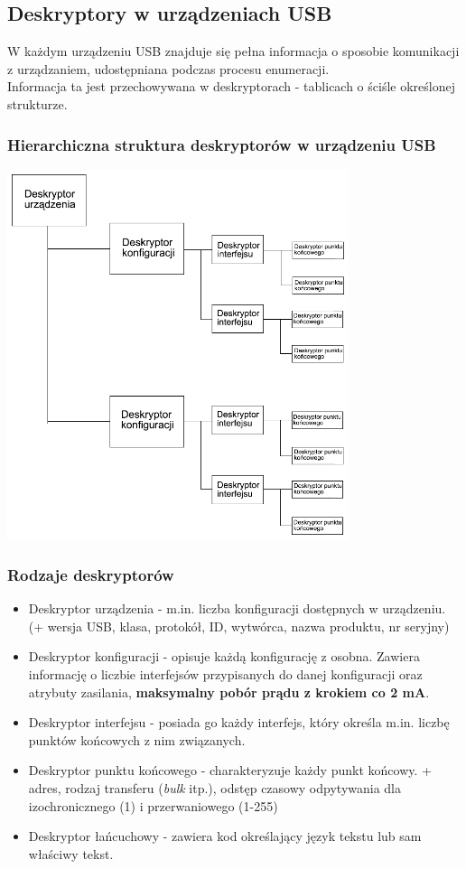 \subsection{Deskryptory w urządzeniach USB}
	W każdym urządzeniu USB znajduje się pełna informacja o sposobie komunikacji z urządzaniem, udostępniana podczas procesu enumeracji.\\
	Informacja ta jest przechowywana w deskryptorach - tablicach o ściśle określonej strukturze.
	\subsubsection{Hierarchiczna struktura deskryptorów w urządzeniu USB}
	\includegraphics[width=10cm]{./wyklady/USB_24_1.pdf}
	\subsubsection{Rodzaje deskryptorów}
	\begin{itemize}
		\item Deskryptor urządzenia - m.in. liczba konfiguracji dostępnych w urządzeniu. (+ wersja USB, klasa, protokół, ID, wytwórca, nazwa produktu, nr seryjny)
		\item Deskryptor konfiguracji - opisuje każdą konfigurację z osobna. Zawiera informację o liczbie interfejsów przypisanych do danej konfiguracji oraz atrybuty zasilania, \textbf{maksymalny pobór prądu z krokiem co 2 mA}.
		\item Deskryptor interfejsu - posiada go każdy interfejs, który określa m.in. liczbę punktów końcowych z nim związanych.
		\item Deskryptor punktu końcowego - charakteryzuje każdy punkt końcowy. + adres, rodzaj transferu (\emph{bulk} itp.), odstęp czasowy odpytywania dla izochronicznego (1) i przerwaniowego (1-255)
		\item Deskryptor łańcuchowy - zawiera kod określający język tekstu lub sam właściwy tekst.
	\end{itemize}
	
